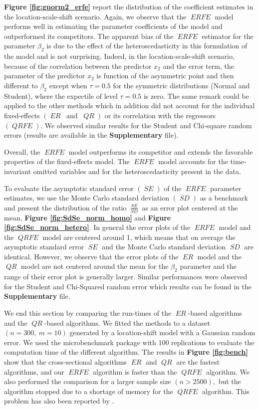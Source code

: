 \documentclass[15pt,a4paper]{article}
\DeclareMathOperator{\ERFE}{\textit{ERFE}}
\DeclareMathOperator{\QRFE}{\textit{QRFE}}
\DeclareMathOperator{\ER}{\textit{ER}}
\DeclareMathOperator{\QR}{\textit{QR}}
\DeclareMathOperator{\SE}{\textit{SE}}
\DeclareMathOperator{\SD}{\textit{SD}}
\begin{document}
\textbf{Figure \ref{fig:gnorm2_erfe}} report the distribution of the coefficient estimates in the location-scale-shift scenario. Again, we observe that the $\ERFE$ model performs well in estimating the parameter coefficients of the model and outperformed its competitors. 
The apparent bias of the $\ERFE$ estimator for the parameter $\beta_2$ is due to the effect of the heteroscedasticity in this formulation of the model and is not surprising. Indeed, in the location-scale-shift scenario, because of the correlation between the predictor $x_2$ and the error term, the parameter of the predictor $x_2$ is function of the asymmetric point and then different to $\beta_2$ except when $\tau=0.5$ for the symmetric distributions (Normal and Student), where the expectile of level $\tau=0.5$ is zero. The same remark could be applied to the other methods which in addition did not account for the individual fixed-effects $(\ER \ \mbox{ and } \ \QR)$ or its correlation with the regressors $(\QRFE).$
We observed similar results for the Student and Chi-square random errors (results are available in the \textbf{Supplementary} file). 

Overall, the $\ERFE$ model outperforms its competitor and extends the favorable properties of the fixed-effects model. The $\ERFE$ model accounts for the time-invariant omitted variables and for the heteroscedasticity present in the data.

To evaluate the asymptotic standard error $(\SE)$ of the $\ERFE$ parameter estimates, we use the Monte Carlo standard deviation $(\SD)$ as a benchmark and present the distribution of the ratio $\frac{\SE}{\SD}$ as an error plot centered at the mean, \textbf{Figure \ref{fig:SdSe_norm_homo}} and \textbf{Figure \ref{fig:SdSe_norm_hetero}}. In general the error plots of the $\ERFE$ model and the $\QRFE$ model are centered around 1, which means that on average the asymptotic standard error $\SE$ and the Monte Carlo standard deviation $\SD$ are identical. However, we observe that the error plots of the $\ER$ model and the $\QR$ model are not centered around the mean for the $\beta_2$ parameter and the range of their error plot is generally larger. Similar performances were observed for the Student and Chi-Squared random error which results can be found in the \textbf{Supplementary} file.


We end this section by comparing the run-times of the $\ER$-based algorithms and the $\QR$-based algorithms. We fitted the methods to a dataset $(n=300, \ m=10)$ generated by a location-shift model with a Gaussian random error. We used the microbenchmark package \citep{microbenchmark2019} with 100 replications to evaluate the computation time of the different algorithm. The results in \textbf{Figure \ref{fig:bench}} show that the cross-sectional algorithms $\ER$ and $\QR$ are the fastest algorithms, and our $\ERFE$ algorithm is faster than the $\QRFE$ algorithm.
We also performed the comparison for a larger sample size $(n>2500),$ but the algorithm stopped due to a shortage of memory for the $\QRFE$ algorithm. This problem has also been reported by \citet{canaySimpleApproachQuantile2011a}.
\end{document}
